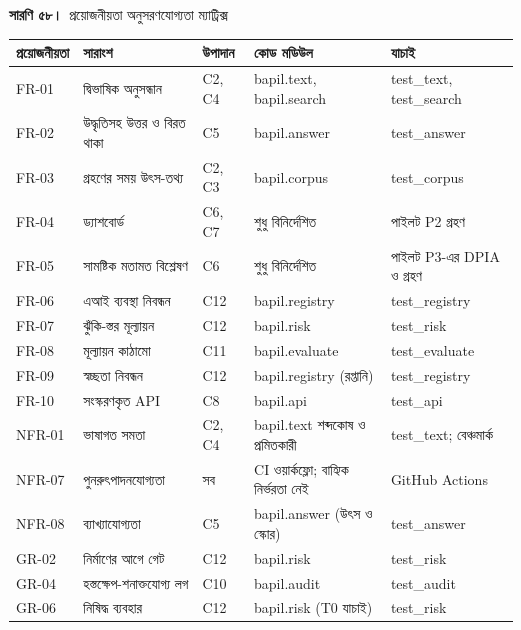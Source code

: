 \documentclass[border=10pt]{standalone}
\begin{document}
\begin{minipage}{17cm}
{\large\bfseries সারণি ৫৮।}\ {\large প্রয়োজনীয়তা অনুসরণযোগ্যতা ম্যাট্রিক্স}\par\vspace{7pt}
\small
{}
\begin{tabularx}{\linewidth}{@{}>{\hsize=0.588\hsize\raggedright\arraybackslash}X>{\hsize=1.765\hsize\raggedright\arraybackslash}X>{\hsize=0.588\hsize\raggedright\arraybackslash}X>{\hsize=1.118\hsize\raggedright\arraybackslash}X>{\hsize=0.941\hsize\raggedright\arraybackslash}X@{}}
\arrayrulecolor{bapilrule}\toprule
\rowcolor{white}\textbf{প্রয়োজনীয়তা} & \textbf{সারাংশ} & \textbf{উপাদান} & \textbf{কোড মডিউল} & \textbf{যাচাই} \\
\midrule
FR-01 & দ্বিভাষিক অনুসন্ধান & C2, C4 & bapil.text, bapil.search & test\_text, test\_search \\
FR-02 & উদ্ধৃতিসহ উত্তর ও বিরত থাকা & C5 & bapil.answer & test\_answer \\
FR-03 & গ্রহণের সময় উৎস-তথ্য & C2, C3 & bapil.corpus & test\_corpus \\
FR-04 & ড্যাশবোর্ড & C6, C7 & শুধু বিনির্দেশিত & পাইলট P2 গ্রহণ \\
FR-05 & সামষ্টিক মতামত বিশ্লেষণ & C6 & শুধু বিনির্দেশিত & পাইলট P3-এর DPIA ও গ্রহণ \\
FR-06 & এআই ব্যবস্থা নিবন্ধন & C12 & bapil.registry & test\_registry \\
FR-07 & ঝুঁকি-স্তর মূল্যায়ন & C12 & bapil.risk & test\_risk \\
FR-08 & মূল্যায়ন কাঠামো & C11 & bapil.evaluate & test\_evaluate \\
FR-09 & স্বচ্ছতা নিবন্ধন & C12 & bapil.registry (রপ্তানি) & test\_registry \\
FR-10 & সংস্করণকৃত API & C8 & bapil.api & test\_api \\
NFR-01 & ভাষাগত সমতা & C2, C4 & bapil.text শব্দকোষ ও প্রমিতকারী & test\_text; বেঞ্চমার্ক \\
NFR-07 & পুনরুৎপাদনযোগ্যতা & সব & CI ওয়ার্কফ্লো; বাহ্যিক নির্ভরতা নেই & GitHub Actions \\
NFR-08 & ব্যাখ্যাযোগ্যতা & C5 & bapil.answer (উৎস ও স্কোর) & test\_answer \\
GR-02 & নির্মাণের আগে গেট & C12 & bapil.risk & test\_risk \\
GR-04 & হস্তক্ষেপ-শনাক্তযোগ্য লগ & C10 & bapil.audit & test\_audit \\
GR-06 & নিষিদ্ধ ব্যবহার & C12 & bapil.risk (T0 যাচাই) & test\_risk \\
\bottomrule
\end{tabularx}
\par{}
\end{minipage}
\end{document}
